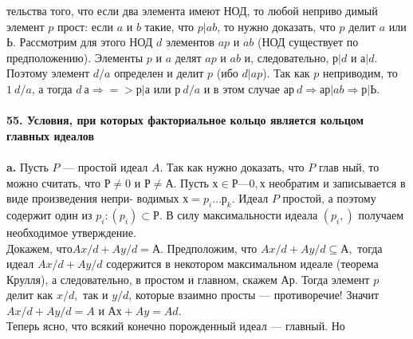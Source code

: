тельства того, что если два элемента имеют НОД, то любой неприво­\linebreak
димый элемент $p$ прост: если $a$ и $b$ такие, что $p | ab$, то нужно доказать,\linebreak
что $p$ делит $a$ или $Ь$. Рассмотрим для этого НОД $d$ элементов $ap$ и $ab$\linebreak
(НОД существует по предположению). Элементы $p$ и $a$ делят $ap$ и $ab$ и, \linebreak
следовательно, $р | d$ и $а | d$. Поэтому элемент $d/a$ определен и делит $p$\linebreak
(ибо $d | ap$). Так как $p$ неприводим, то $1 ~ d/a$, а тогда $d ~ а \Rightarrow=> р | а$\linebreak
или $р ~ d/a$ и в этом случае $ар ~ d \Rightarrow ар | ab \Rightarrow р | Ь.$\\
\\
\noindent\textbf{55. Условия, при которых факториальное кольцо является\linebreak
кольцом главных идеалов}\\
\\
\hspace*{15pt}\textbf{a.} Пусть $P$ --- простой идеал $A$. Так как нужно доказать, что $P$ глав­\linebreak
ный, то можно считать, что $Р \neq {0}$ и $Р \neq А$. Пусть\linebreak
$х \in Р — {0}, х$ необратим и записывается в виде произведения непри-\linebreak
водимых $х = p_i\ldots р_k$. Идеал $P$ простой, а поэтому содержит один из \linebreak
$p_{i}: (p_i) \subset Р .$ В силу максимальности идеала $(p_i,)$ получаем необходимое\linebreak
утверждение.\\
\hspace*{0pt} Докажем, $что Ax/d + Ay/d = А.$ Предположим, что $Ax/d + A y/d \subseteq А,$\linebreak
тогда идеал $Ax/d + Ay/d$ содержится в некотором максимальном идеале\linebreak
(теорема Крулля), а следовательно, в простом и главном, скажем $Ар.$\linebreak
Тогда элемент $p$ делит как $x/d,$ так и $y/d$, которые взаимно просты ---\linebreak
противоречие! Значит $Ax/d + Ay/d = A$ и $Ах + Ay = Ad$.\\
\hspace*{0pt} Теперь ясно, что всякий конечно порожденный идеал --- главный. Но\linebreak
